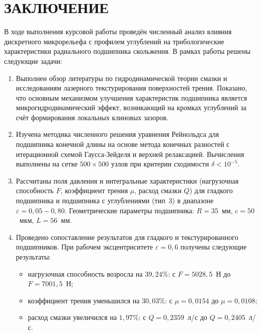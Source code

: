 \section*{ЗАКЛЮЧЕНИЕ}
{}

В ходе выполнения курсовой работы проведён численный анализ влияния дискретного микрорельефа с \varDimpleTypeGenitive{} профилем углублений на трибологические характеристики радиального подшипника скольжения. В рамках работы решены следующие задачи:

\begin{enumerate}
    \item Выполнен обзор литературы по гидродинамической теории смазки и исследованиям лазерного текстурирования поверхностей трения. Показано, что основным механизмом улучшения характеристик подшипника является микрогидродинамический эффект, возникающий на кромках углублений за счёт формирования локальных клиновых зазоров.

    \item Изучена методика численного решения уравнения Рейнольдса для подшипника конечной длины на основе метода конечных разностей с итерационной схемой Гаусса-Зейделя и верхней релаксацией. Вычисления выполнены на сетке $500 \times 500$ узлов при критерии сходимости $\delta < 10^{-5}$.

    \item Рассчитаны поля давления и интегральные характеристики (нагрузочная способность $F$, коэффициент трения $\mu$, расход смазки $Q$) для гладкого подшипника и подшипника с \varDimpleTypeGenitive{} углублениями (тип~3) в диапазоне $\varepsilon = 0{,}05 - 0{,}80$. Геометрические параметры подшипника: $R = 35$~мм, $c = 50$~мкм, $L = 56$~мм.

    \item Проведено сопоставление результатов для гладкого и текстурированного подшипников. При рабочем эксцентриситете $\varepsilon = 0{,}6$ получены следующие результаты:
    \begin{itemize}
        \item нагрузочная способность возросла на $39{,}24$\%: с $F = 5028{,}5$~Н до $F = 7001{,}5$~Н;
        \item коэффициент трения уменьшился на $30{,}03$\%: с $\mu = 0{,}0154$ до $\mu = 0{,}0108$;
        \item расход смазки увеличился на $1{,}97$\%: с $Q = 0{,}2359$~л/с до $Q = 0{,}2405$~л/с.
    \end{itemize}
\end{enumerate}

